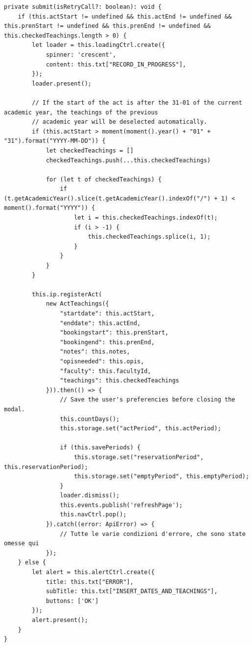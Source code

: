 \documentclass[Lau, oneside, noexaminfo]{sapthesis}%
\begin{document}
\begin{lstlisting}
private submit(isRetryCall?: boolean): void {
	if (this.actStart != undefined && this.actEnd != undefined && this.prenStart != undefined && this.prenEnd != undefined && this.checkedTeachings.length > 0) {
		let loader = this.loadingCtrl.create({
			spinner: 'crescent',
			content: this.txt["RECORD_IN_PROGRESS"],
		});
		loader.present();
		
		// If the start of the act is after the 31-01 of the current academic year, the teachings of the previous
		// academic year will be deselected automatically.
		if (this.actStart > moment(moment().year() + "01" + "31").format("YYYY-MM-DD")) {
			let checkedTeachings = []
			checkedTeachings.push(...this.checkedTeachings)

			for (let t of checkedTeachings) {
				if (t.getAcademicYear().slice(t.getAcademicYear().indexOf("/") + 1) < moment().format("YYYY")) {
					let i = this.checkedTeachings.indexOf(t);
					if (i > -1) {
						this.checkedTeachings.splice(i, 1);
					}
				}
			}
		}

		this.ip.registerAct(
			new ActTeachings({
				"startdate": this.actStart,
				"enddate": this.actEnd,
				"bookingstart": this.prenStart,
				"bookingend": this.prenEnd,
				"notes": this.notes,
				"opisneeded": this.opis,
				"faculty": this.facultyId,
				"teachings": this.checkedTeachings
			})).then(() => {
				// Save the user's preferencies before closing the modal.
				this.countDays();
				this.storage.set("actPeriod", this.actPeriod);
				
				if (this.savePeriods) {
					this.storage.set("reservationPeriod", this.reservationPeriod);
					this.storage.set("emptyPeriod", this.emptyPeriod);
				}
				loader.dismiss();
				this.events.publish('refreshPage');
				this.navCtrl.pop();
			}).catch((error: ApiError) => {
				// Tutte le varie condizioni d'errore, che sono state omesse qui
			});
	} else {
		let alert = this.alertCtrl.create({
			title: this.txt["ERROR"],
			subTitle: this.txt["INSERT_DATES_AND_TEACHINGS"],
			buttons: ['OK']
		});
		alert.present();
	}
}
\end{lstlisting}
\end{document}
